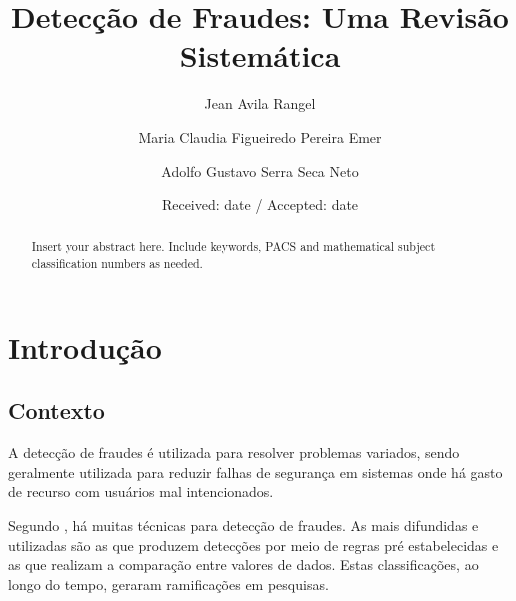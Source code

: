 \documentclass[smallextended]{svjour3}       %
\begin{document}
	
\title{Detecção de Fraudes: Uma Revisão Sistemática
}
\subtitle{}


\author{Jean Avila Rangel         \and
	Maria Claudia Figueiredo Pereira Emer \and
	Adolfo Gustavo Serra Seca Neto
}

	\date{Received: date / Accepted: date}
	\maketitle
	
	\begin{abstract}
		Insert your abstract here. Include keywords, PACS and mathematical
		subject classification numbers as needed.
	\end{abstract}
	
\section{Introdução}

\subsection{Contexto}

A detecção de fraudes é utilizada para resolver problemas variados, sendo geralmente utilizada para reduzir falhas de segurança em sistemas onde há gasto de recurso com usuários mal intencionados.

Segundo \cite{Fawcett1997}, há muitas técnicas para detecção de fraudes. As mais difundidas e utilizadas são as que produzem detecções por meio de regras pré estabelecidas e as que realizam a comparação entre valores de dados. Estas classificações, ao longo do tempo, geraram ramificações em pesquisas.
\end{document}
